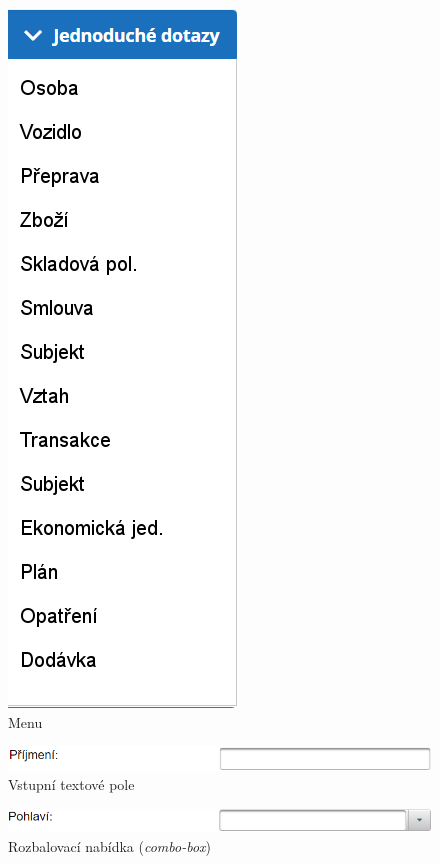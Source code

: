 \documentclass[thesis=M,czech]{FITthesis}[2019/12/23]
\begin{document}
\begin{figure}[H]
  \centering
  \includegraphics[scale=0.5]{res/guide/Menu.png}
  \caption{Menu}
  \label{fig:Menu}
\end{figure}

\begin{figure}[H]
  \centering
  \includegraphics[scale=0.5]{res/guide/TextBox.png}
  \caption{Vstupní textové pole}
  \label{fig:Vstupní textové pole}
\end{figure}

\begin{figure}[H]
  \centering
  \includegraphics[scale=0.5]{res/guide/ComboBox.png}
  \caption{Rozbalovací nabídka (\textit{combo-box})}
  \label{fig:Rozbalovací nabídka (combo-box)}
\end{figure}
\end{document}
